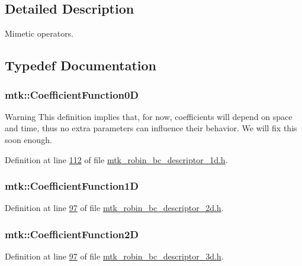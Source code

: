 \subsection{Detailed Description}
Mimetic operators. 

\subsection{Typedef Documentation}
\hypertarget{group__c07-mim__ops_ga04276745b4d511f0f3c636d6e0df7c2d}{
\subsubsection[{Coefficient\+Function0\+D}]{\setlength{\rightskip}{0pt plus 5cm}mtk\+::\+Coefficient\+Function0\+D}}\label{group__c07-mim__ops_ga04276745b4d511f0f3c636d6e0df7c2d}
\begin{DoxyWarning}{Warning}
This definition implies that, for now, coefficients will depend on space and time, thus no extra parameters can influence their behavior. We will fix this soon enough. 
\end{DoxyWarning}


Definition at line \hyperlink{mtk__robin__bc__descriptor__1d_8h_source_l00112}{112} of file \hyperlink{mtk__robin__bc__descriptor__1d_8h_source}{mtk\+\_\+robin\+\_\+bc\+\_\+descriptor\+\_\+1d.\+h}.

\hypertarget{group__c07-mim__ops_gaa79593eeb6676d6011db339e01983909}{
\subsubsection[{Coefficient\+Function1\+D}]{\setlength{\rightskip}{0pt plus 5cm}mtk\+::\+Coefficient\+Function1\+D}}\label{group__c07-mim__ops_gaa79593eeb6676d6011db339e01983909}


Definition at line \hyperlink{mtk__robin__bc__descriptor__2d_8h_source_l00097}{97} of file \hyperlink{mtk__robin__bc__descriptor__2d_8h_source}{mtk\+\_\+robin\+\_\+bc\+\_\+descriptor\+\_\+2d.\+h}.

\hypertarget{group__c07-mim__ops_ga0ff293d1fd754006d64a3588971dc5c4}{
\subsubsection[{Coefficient\+Function2\+D}]{\setlength{\rightskip}{0pt plus 5cm}mtk\+::\+Coefficient\+Function2\+D}}\label{group__c07-mim__ops_ga0ff293d1fd754006d64a3588971dc5c4}


Definition at line \hyperlink{mtk__robin__bc__descriptor__3d_8h_source_l00097}{97} of file \hyperlink{mtk__robin__bc__descriptor__3d_8h_source}{mtk\+\_\+robin\+\_\+bc\+\_\+descriptor\+\_\+3d.\+h}.

